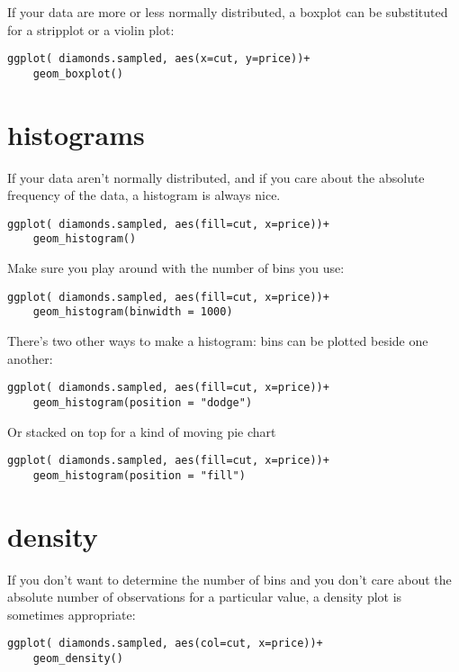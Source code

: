 \documentclass[11pt]{article}
\begin{document}
If your data are more or less normally distributed, a boxplot can be
substituted for a stripplot or a violin plot:

\begin{verbatim}
ggplot( diamonds.sampled, aes(x=cut, y=price))+
    geom_boxplot()
\end{verbatim}
\section{histograms}
\label{sec-4}

If your data aren't normally distributed, and if you care about the
absolute frequency of the data, a histogram is always nice.

\begin{verbatim}
ggplot( diamonds.sampled, aes(fill=cut, x=price))+
    geom_histogram()
\end{verbatim}


Make sure you play around with the number of bins you use:

\begin{verbatim}
ggplot( diamonds.sampled, aes(fill=cut, x=price))+
    geom_histogram(binwidth = 1000)
\end{verbatim}


There's two other ways to make a histogram: bins can be plotted beside
one another:

\begin{verbatim}
ggplot( diamonds.sampled, aes(fill=cut, x=price))+
    geom_histogram(position = "dodge")
\end{verbatim}


Or stacked on top for a kind of moving pie chart

\begin{verbatim}
ggplot( diamonds.sampled, aes(fill=cut, x=price))+
    geom_histogram(position = "fill")
\end{verbatim}
\section{density}
\label{sec-5}


If you don't want to determine the number of bins and you don't care
about the absolute number of observations for a particular value, a density plot is
sometimes appropriate:


\begin{verbatim}
ggplot( diamonds.sampled, aes(col=cut, x=price))+
    geom_density()
\end{verbatim}
\end{document}
